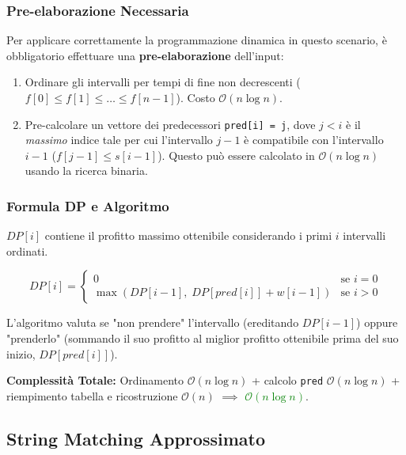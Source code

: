 \documentclass[12pt, a4paper]{article}
\begin{document}
\subsubsection{Pre-elaborazione Necessaria}
Per applicare correttamente la programmazione dinamica in questo scenario, è obbligatorio effettuare una \textbf{pre-elaborazione} dell'input:
\begin{enumerate}
\item Ordinare gli intervalli per tempi di fine non decrescenti ($f[0] \le f[1] \le \dots \le f[n-1]$). Costo $\mathcal{O}(n \log n)$.
\item Pre-calcolare un vettore dei predecessori \texttt{pred[i] = j}, dove $j < i$ è il \textit{massimo} indice tale per cui l'intervallo $j-1$ è compatibile con l'intervallo $i-1$ ($f[j-1] \le s[i-1]$). Questo può essere calcolato in $\mathcal{O}(n \log n)$ usando la ricerca binaria.
\end{enumerate}

\subsubsection{Formula DP e Algoritmo}
$DP[i]$ contiene il profitto massimo ottenibile considerando i primi $i$ intervalli ordinati.


$$DP[i] = \begin{cases} 0 & \text{se } i = 0 \\ \max(DP[i-1], \; DP[pred[i]] + w[i-1]) & \text{se } i > 0 \end{cases}$$


L'algoritmo valuta se "non prendere" l'intervallo (ereditando $DP[i-1]$) oppure "prenderlo" (sommando il suo profitto al miglior profitto ottenibile prima del suo inizio, $DP[pred[i]]$).

\textbf{Complessità Totale:} Ordinamento $\mathcal{O}(n \log n)$ + calcolo \texttt{pred} $\mathcal{O}(n \log n)$ + riempimento tabella e ricostruzione $\mathcal{O}(n)$ $\implies$ \textcolor{green}{$\mathcal{O}(n \log n)$}.

\newpage

\subsection{String Matching Approssimato}
\end{document}

